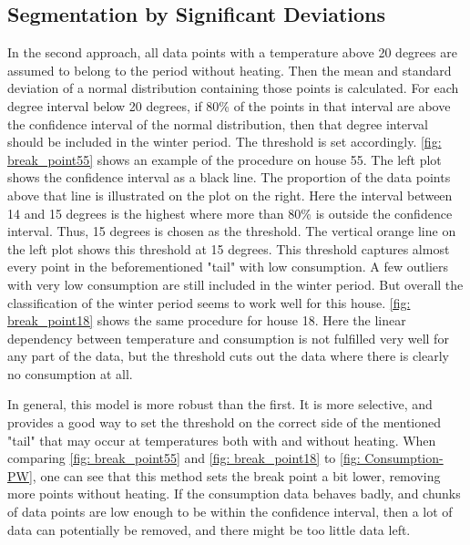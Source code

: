 \subsection{Segmentation by Significant Deviations}
In the second approach, all data points with a temperature
above 20 degrees are assumed to belong to the period without heating. Then the mean and standard deviation of a normal distribution containing those points is calculated.
For each degree interval below 20 degrees, if 80\% of the points in that interval are above the confidence interval of the normal distribution, then that degree interval should be included in the winter period. The threshold is set accordingly. \cref{fig: break_point55} shows an example of the procedure on house 55. The left plot shows the confidence interval as a black line. The proportion of the data points above that line is illustrated on the plot on the right. Here the interval between 14 and 15 degrees is the highest where more than 80\% is outside the confidence interval. Thus, 15 degrees is chosen as the threshold. The vertical orange line on the left plot shows this threshold at 15 degrees. This threshold captures almost every point in the beforementioned "tail" with low consumption. A few outliers with very low consumption are still included in the winter period. But overall the classification of the winter period seems to work well for this house. \cref{fig: break_point18} shows the same procedure for house 18. Here the linear dependency between temperature and consumption is not fulfilled very well for any part of the data, but the threshold cuts out the data where there is clearly no consumption at all.

\noindent In general, this model is more robust than the first. It is more selective, and provides a good way to set the threshold on the correct side of the mentioned "tail" that may occur at temperatures both with and without heating.
When comparing \cref{fig: break_point55} and \cref{fig: break_point18} to \cref{fig: Consumption-PW}, one can see that this method sets the break point a bit lower, removing more points without heating. If the consumption data behaves badly, and chunks of data points are low enough to be within the confidence interval, then a lot of data can potentially be removed, and there might be too little data left.


